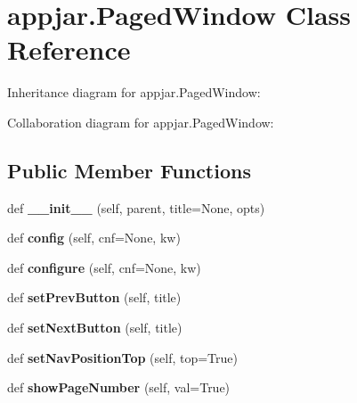 \hypertarget{classappjar_1_1_paged_window}{}\section{appjar.\+Paged\+Window Class Reference}
\label{classappjar_1_1_paged_window}


Inheritance diagram for appjar.\+Paged\+Window\+:


Collaboration diagram for appjar.\+Paged\+Window\+:
\subsection*{Public Member Functions}
\begin{DoxyCompactItemize}
\item 
\mbox{\label{classappjar_1_1_paged_window_a7e7087fb12084abb115a49f15073fdfc}} 
def {\bfseries \+\_\+\+\_\+init\+\_\+\+\_\+} (self, parent, title=None, opts)
\item 
\mbox{\label{classappjar_1_1_paged_window_a353ddbb12b446830945fe123c8f182d5}} 
def {\bfseries config} (self, cnf=None, kw)
\item 
\mbox{\label{classappjar_1_1_paged_window_a198ebe5bf843a123dd267f5ca47ab534}} 
def {\bfseries configure} (self, cnf=None, kw)
\item 
\mbox{\label{classappjar_1_1_paged_window_aef674d2381582b22cde7db4a8d1b9d75}} 
def {\bfseries set\+Prev\+Button} (self, title)
\item 
\mbox{\label{classappjar_1_1_paged_window_a5c9b22bde32d897c2a78129ce9e31a34}} 
def {\bfseries set\+Next\+Button} (self, title)
\item 
\mbox{\label{classappjar_1_1_paged_window_ade8a0bff3f3bc641d46ce8ab797dca17}} 
def {\bfseries set\+Nav\+Position\+Top} (self, top=True)
\item 
\mbox{\label{classappjar_1_1_paged_window_abd67a29bb4a868f57bd466a6c29832ba}} 
def {\bfseries show\+Page\+Number} (self, val=True)

\end{DoxyCompactItemize}
